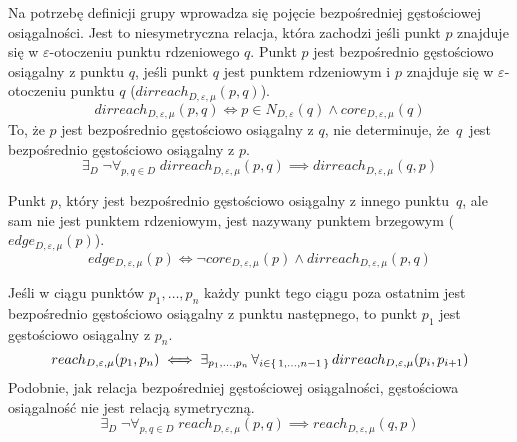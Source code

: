 \newline
Na potrzebę definicji grupy wprowadza się pojęcie bezpośredniej gęstościowej osiągalności. Jest to niesymetryczna relacja, która zachodzi jeśli punkt $ p $ znajduje się w $ \varepsilon $-otoczeniu punktu rdzeniowego $ q $. Punkt $ p $ jest bezpośrednio gęstościowo osiągalny z punktu $ q $, jeśli punkt $ q $ jest punktem rdzeniowym i $ p $ znajduje się w $ \varepsilon $-otoczeniu punktu $ q $ ($ dirreach_{D,\varepsilon,\mu}(p, q) $).
\begin{equation} \label{direct-reachability}
	dirreach_{D,\varepsilon,\mu}(p, q) \iff p \in N_{D,\varepsilon}(q) \land core_{D,\varepsilon,\mu}(q)
\end{equation}
To, że $ p $ jest bezpośrednio gęstościowo osiągalny z $ q $, nie determinuje, \mbox{że $ q $ jest} bezpośrednio gęstościowo osiągalny z $ p $.
\begin{equation} \label{direct-reachability-asymmetry}
	\exists_D\;\neg\forall_{p,q\in D}\;dirreach_{D,\varepsilon,\mu}(p, q) \implies dirreach_{D,\varepsilon,\mu}(q, p)
\end{equation}

\newline
Punkt $ p $, który jest bezpośrednio gęstościowo osiągalny z innego \mbox{punktu $ q $}, ale sam nie jest punktem rdzeniowym, jest nazywany punktem brzegowym ($ edge_{D,\varepsilon,\mu}(p) $).
\begin{equation}\label{edge-point}
	edge_{D,\varepsilon,\mu}(p) \iff \neg core_{D,\varepsilon,\mu}(p) \land dirreach_{D,\varepsilon,\mu}(p,q)
\end{equation}

\newline
Jeśli w ciągu punktów $ p_1,\dots,p_n $ każdy punkt tego ciągu poza ostatnim jest bezpośrednio gęstościowo osiągalny z punktu następnego, to punkt $ p_1 $ jest gęstościowo osiągalny z $ p_n $.
\begin{equation}
	reach_{D,\varepsilon,\mu}(p_1, p_n)	\iff 	\exists_{p_1,\dots,p_n}\,\forall_{i\in\set{1,\dots,n-1}}\,dirreach_{D,\varepsilon,\mu}(p_i, p_{i+1})
\end{equation}
Podobnie, jak relacja bezpośredniej gęstościowej osiągalności, gęstościowa osiągalność nie jest relacją symetryczną.
\begin{equation}
	\exists_D\;\neg\forall_{p,q\in D}\;reach_{D,\varepsilon,\mu}(p, q) \implies reach_{D,\varepsilon,\mu}(q, p)
\end{equation}

